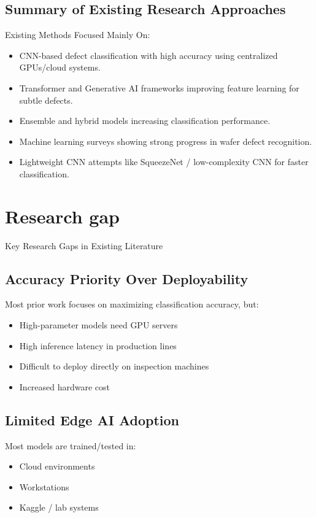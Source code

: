  \subsection{Summary of Existing Research Approaches}
 Existing Methods Focused Mainly On:
 \begin{itemize}
 \item CNN-based defect classification with high accuracy using centralized GPUs/cloud systems.
 \item Transformer and Generative AI frameworks improving feature learning for subtle defects.
 \item Ensemble and hybrid models increasing classification performance.
 \item Machine learning surveys showing strong progress in wafer defect recognition.
 \item Lightweight CNN attempts like SqueezeNet / low-complexity CNN for faster classification.
 \end{itemize}

\section{Research gap}
Key Research Gaps in Existing Literature
\subsection{Accuracy Priority Over Deployability}

Most prior work focuses on maximizing classification accuracy, but:
\begin{itemize}
     \item High-parameter models need GPU servers
     \item High inference latency in production lines
     \item Difficult to deploy directly on inspection machines
     \item Increased hardware cost
 \end{itemize}

 \subsection{Limited Edge AI Adoption}
 Most models are trained/tested in:
 \begin{itemize}
     \item Cloud environments
     \item Workstations
     \item Kaggle / lab systems
\end{itemize}

